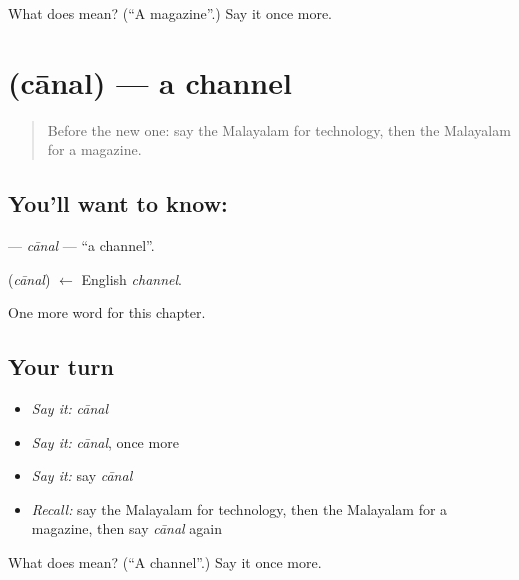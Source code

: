 \begin{tcolorbox}[breakable,colback=teal!4,colframe=teal!35!black,title={Before you move on}]
What does  mean? (\textquotedblleft{}A magazine\textquotedblright{}.) Say it once more.
\end{tcolorbox}
\section[\texorpdfstring{\ml{ചാനൽ} (cānal)}{ചാനൽ (cānal)}]{ (cānal) — a channel}

\label{lesson:ML-C293-canal}



\begin{quote}
Before the new one: say the Malayalam for technology, then the Malayalam for a magazine.
\end{quote}

\subsection*{You'll want to know: }
\textbf{} — \emph{cānal} — \textquotedblleft{}a channel\textquotedblright{}.

\begin{cousinweb}
\textbf{} (\emph{cānal}) $\leftarrow$ English \emph{channel}.
\end{cousinweb}

\begin{grammarlens}[title={What you've built}]
One more word for this chapter.
\end{grammarlens}

\subsection*{Your turn}
\begin{itemize}
\raggedright
  \item \emph{Say it:} \emph{cānal}
  \item \emph{Say it:} \emph{cānal}, once more
  \item \emph{Say it:} say \emph{cānal}
  \item \emph{Recall:} say the Malayalam for technology, then the Malayalam for a magazine, then say \emph{cānal} again
\end{itemize}

\begin{tcolorbox}[breakable,colback=teal!4,colframe=teal!35!black,title={Before you move on}]
What does  mean? (\textquotedblleft{}A channel\textquotedblright{}.) Say it once more.
\end{tcolorbox}
